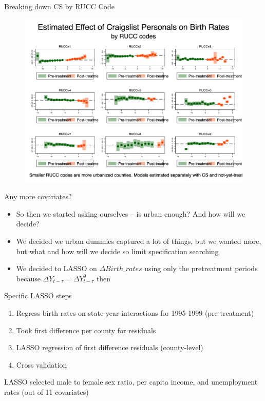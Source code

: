 \documentclass{beamer}
\begin{document}
\begin{frame}{Breaking down CS by RUCC Code}
\begin{figure}
    \centering
    \includegraphics[height=0.85\textheight]{./lecture_includes/es_br1544_RUCCcombined.png}
\end{figure}

\end{frame}

\begin{frame}{Any more covariates?}

\begin{itemize}

\item So then we started asking ourselves -- is urban enough?  And how will we decide?
\item We decided we urban dummies captured a lot of things, but we wanted more, but what and how will we decide so limit specification searching
\item We decided to LASSO on $\Delta Birth\_rates$ using only the pretreatment periods because $\Delta Y_{t-\tau} = \Delta Y^0_{t-\tau}$ then 

\end{itemize}

\end{frame}

\begin{frame}{Specific LASSO steps}

\begin{enumerate}
\item Regress birth rates on state-year interactions for 1995-1999 (pre-treatment)
\item Took first difference per county for residuals
\item LASSO regression of first difference residuals (county-level)
\item Cross validation
\end{enumerate}

LASSO selected male to female sex ratio, per capita income, and unemployment rates (out of 11 covariates)

\end{frame}
\end{document}
